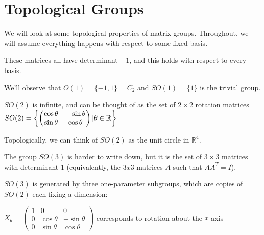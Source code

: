 
\section*{Topological Groups}

We will look at some topological properties of matrix groups.  Throughout, we will assume everything happens with respect to some fixed basis.


These matrices all have determinant $\pm 1$, and this holds with respect to every basis.


We'll observe that $O(1) = \{-1,1\} = C_2$ and  $SO(1) = \{1\}$ is the trivial group.

$SO(2)$ is infinite, and can be thought of as the set of $2\times 2$ rotation matrices
$SO(2)= \left\{  \begin{pmatrix}
\cos\theta & -\sin\theta \\
\sin\theta & \cos\theta
\end{pmatrix}  | \theta\in\mathbb{R}   \right\}$


Topologically, we can think of $SO(2)$ as the unit circle in $\mathbb{R}^4$.

The group $SO(3)$ is harder to write down, but it is the set of $3\times 3$ matrices with determinant $1$ (equivalently, the $3x3$ matrices $A$ such that $AA^T=I$).

$SO(3)$ is generated by three one-parameter subgroups, which are copies of $SO(2)$ each fixing a dimension: 

$X_\theta = 
\begin{pmatrix} 
1 & 0 & 0 \\
0 & \cos\theta & -\sin\theta \\
0 & \sin\theta & \cos\theta
\end{pmatrix}
$ corresponds to rotation about the $x$-axis

